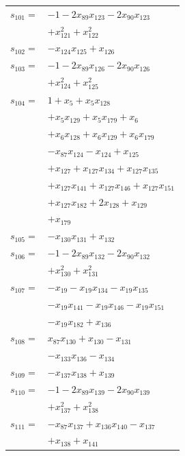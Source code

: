 \begin{longtable}{@{}r@{\;}l@{}}
\(s_{101}=\) & \(\displaystyle -1 -2x_{89}x_{123} -2x_{90}x_{123}\) \\
 & \(\displaystyle +x_{121}^{2} +x_{122}^{2}\) \\[3pt]
\(s_{102}=\) & \(\displaystyle -x_{124}x_{125} +x_{126}\) \\[3pt]
\(s_{103}=\) & \(\displaystyle -1 -2x_{89}x_{126} -2x_{90}x_{126}\) \\
 & \(\displaystyle +x_{124}^{2} +x_{125}^{2}\) \\[3pt]
\(s_{104}=\) & \(\displaystyle 1 +x_{5} +x_{5}x_{128}\) \\
 & \(\displaystyle +x_{5}x_{129} +x_{5}x_{179} +x_{6}\) \\
 & \(\displaystyle +x_{6}x_{128} +x_{6}x_{129} +x_{6}x_{179}\) \\
 & \(\displaystyle -x_{87}x_{124} -x_{124} +x_{125}\) \\
 & \(\displaystyle +x_{127} +x_{127}x_{134} +x_{127}x_{135}\) \\
 & \(\displaystyle +x_{127}x_{141} +x_{127}x_{146} +x_{127}x_{151}\) \\
 & \(\displaystyle +x_{127}x_{182} +2x_{128} +x_{129}\) \\
 & \(\displaystyle +x_{179}\) \\[3pt]
\(s_{105}=\) & \(\displaystyle -x_{130}x_{131} +x_{132}\) \\[3pt]
\(s_{106}=\) & \(\displaystyle -1 -2x_{89}x_{132} -2x_{90}x_{132}\) \\
 & \(\displaystyle +x_{130}^{2} +x_{131}^{2}\) \\[3pt]
\(s_{107}=\) & \(\displaystyle -x_{19} -x_{19}x_{134} -x_{19}x_{135}\) \\
 & \(\displaystyle -x_{19}x_{141} -x_{19}x_{146} -x_{19}x_{151}\) \\
 & \(\displaystyle -x_{19}x_{182} +x_{136}\) \\[3pt]
\(s_{108}=\) & \(\displaystyle x_{87}x_{130} +x_{130} -x_{131}\) \\
 & \(\displaystyle -x_{133}x_{136} -x_{134}\) \\[3pt]
\(s_{109}=\) & \(\displaystyle -x_{137}x_{138} +x_{139}\) \\[3pt]
\(s_{110}=\) & \(\displaystyle -1 -2x_{89}x_{139} -2x_{90}x_{139}\) \\
 & \(\displaystyle +x_{137}^{2} +x_{138}^{2}\) \\[3pt]
\(s_{111}=\) & \(\displaystyle -x_{87}x_{137} +x_{136}x_{140} -x_{137}\) \\
 & \(\displaystyle +x_{138} +x_{141}\) \\[3pt]

\end{longtable}
